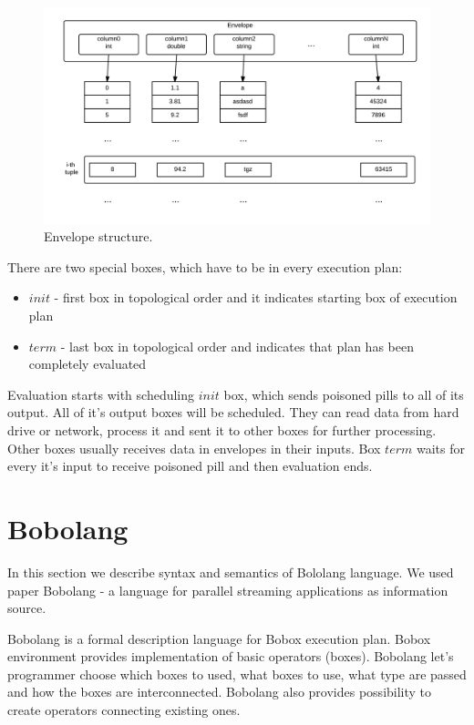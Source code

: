 \begin{figure}[h!]
  \centering
    \includegraphics[width=1\textwidth]{envelope}

      \caption{Envelope structure.}
          \label{fig:envelope}
\end{figure}
There are two special boxes, which have to be in every execution plan:
\begin{itemize}


\item $init$ - first box in topological order and it indicates starting box of execution plan

\item $term$ - last box in topological order and indicates that plan has been completely evaluated

\end{itemize}

Evaluation starts with scheduling $init$ box, which sends poisoned pills to all of its output. All of it's output boxes will be scheduled. They can read data from hard drive or network, process it and sent it to other boxes for further processing. Other boxes usually receives data in envelopes in their inputs. Box $term$ waits for every it's input to receive poisoned pill and then evaluation ends.

\section{Bobolang}
In this section we describe syntax and semantics of Bololang language. We used paper Bobolang - a language for parallel streaming applications\cite{bobolang} as information source.

Bobolang is a formal description language for Bobox execution plan. Bobox environment provides implementation of basic operators (boxes). Bobolang let's programmer choose which boxes to used, what boxes to use, what type are passed and how the boxes are interconnected. Bobolang also provides possibility to create operators connecting existing ones. 

